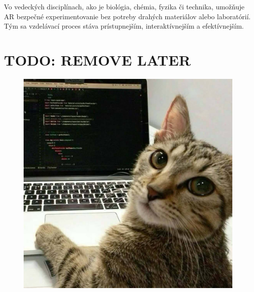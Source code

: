 \documentclass[a4paper,12pt]{article}
\begin{document}
Vo vedeckých disciplínach, ako je biológia, chémia, fyzika či technika, umožňuje AR bezpečné experimentovanie bez potreby drahých materiálov alebo laboratórií. Tým sa vzdelávací proces stáva prístupnejším, interaktívnejším a efektívnejším.

\section{TODO: REMOVE LATER}

\begin{figure}
    \centering
    \includegraphics[width=0.5\linewidth]{images/image.jpg}
    \label{fig:placeholder}
\end{figure}
\end{document}
